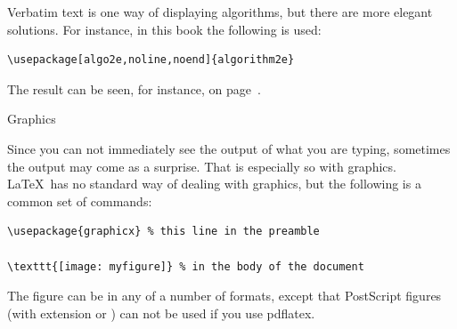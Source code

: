 Verbatim text is one way of displaying algorithms, but there are
more elegant solutions. For instance, in this book the following is
used:
\begin{verbatim}
\usepackage[algo2e,noline,noend]{algorithm2e}
\end{verbatim}
The result can be seen, for instance, on page~\pageref{fig:taskqueue}.

 {Graphics}

Since you can not immediately see the output of what you are typing,
sometimes the output may come as a surprise. That is especially so
with graphics. \LaTeX\ has no standard way of dealing with graphics,
but the following is a common set of commands:
\begin{verbatim}
\usepackage{graphicx} % this line in the preamble

\texttt{[image: myfigure]} % in the body of the document
\end{verbatim}
The figure can be in any of a number of formats, except that
PostScript figures (with extension  or )
can not be used if you use pdflatex.

